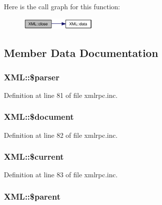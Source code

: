 Here is the call graph for this function:\nopagebreak
\begin{figure}[H]
\begin{center}
\leavevmode
\includegraphics[width=107pt]{classXML_60144a2134fc1b7f5b4b1b6a7c56bf04_cgraph}
\end{center}
\end{figure}


\subsection{Member Data Documentation}
\hypertarget{classXML_fa14fbca44236b30ab5f3dcfc4b02890}{
\subsubsection{\setlength{\rightskip}{0pt plus 5cm}XML::\$parser}}
\label{classXML_fa14fbca44236b30ab5f3dcfc4b02890}




Definition at line 81 of file xmlrpc.inc.\hypertarget{classXML_01d565098eeda8bf09e4242a2748d570}{
\subsubsection{\setlength{\rightskip}{0pt plus 5cm}XML::\$document}}
\label{classXML_01d565098eeda8bf09e4242a2748d570}




Definition at line 82 of file xmlrpc.inc.\hypertarget{classXML_7c20d75c1719294f3320a537a32753ca}{
\subsubsection{\setlength{\rightskip}{0pt plus 5cm}XML::\$current}}
\label{classXML_7c20d75c1719294f3320a537a32753ca}




Definition at line 83 of file xmlrpc.inc.\hypertarget{classXML_fa51193c2f0b317f817fa3efa8722227}{
\subsubsection{\setlength{\rightskip}{0pt plus 5cm}XML::\$parent}}
\label{classXML_fa51193c2f0b317f817fa3efa8722227}




